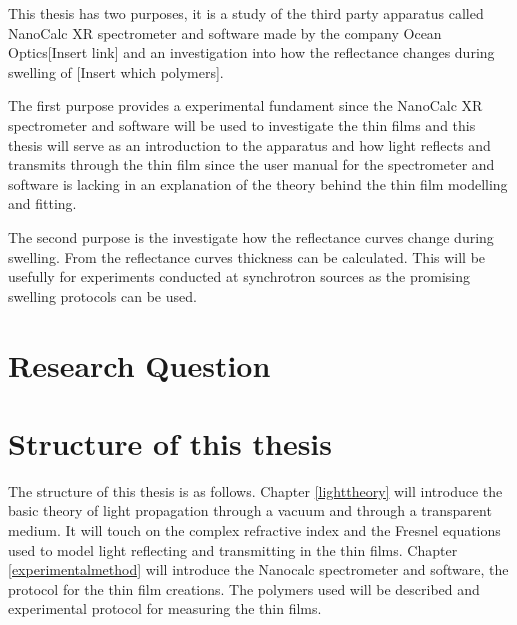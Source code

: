 \documentclass[MasterThesisMain.tex]{subfiles}
\begin{document}
This thesis has two purposes, it is a study of the third party apparatus called NanoCalc XR spectrometer and software made by the company Ocean Optics[Insert link] and an investigation into how the reflectance changes during swelling of [Insert which polymers].

The first purpose provides a experimental fundament since the NanoCalc XR spectrometer and software will be used to investigate the thin films and this thesis will serve as an introduction to the apparatus and how light reflects and transmits through the thin film since the user manual for the spectrometer and software is lacking in an explanation of the theory behind the thin film modelling and fitting.

The second purpose is the investigate how the reflectance curves change during swelling. From the reflectance curves thickness can be calculated. This will be usefully for experiments conducted at synchrotron sources as the promising swelling protocols can be used.     

	\section{Research Question}
	
	\section{Structure of this thesis} 
The structure of this thesis is as follows. Chapter \ref{lighttheory} will introduce the basic theory of light propagation through a vacuum and through a transparent medium. It will touch on the complex refractive index and the Fresnel equations used to model light reflecting and transmitting in the thin films. Chapter \ref{experimentalmethod} will introduce the Nanocalc spectrometer and software, the protocol for the thin film creations. The polymers used will be described and experimental protocol for measuring the thin films.          
\end{document}
